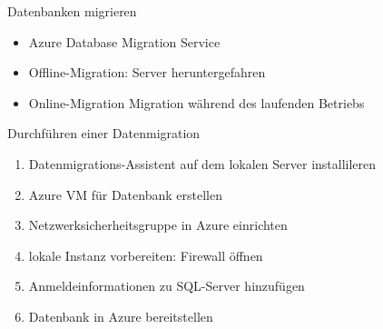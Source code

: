 \begin{flashcard}[Definition]{Datenbanken migrieren}
    \begin{itemize}
        \item Azure Database Migration Service
        \item Offline-Migration:\newline
            Server heruntergefahren
        \item Online-Migration\newline
            Migration während des laufenden Betriebs
    \end{itemize}
\end{flashcard}

\begin{flashcard}[Definition]{Durchführen einer Datenmigration}
    \begin{enumerate}
        \item Datenmigrations-Assistent auf dem lokalen Server installileren
        \item Azure VM für Datenbank erstellen
        \item Netzwerksicherheitsgruppe in Azure einrichten
        \item lokale Instanz vorbereiten: Firewall öffnen
        \item Anmeldeinformationen zu SQL-Server hinzufügen
        \item Datenbank in Azure bereitstellen
    \end{enumerate}
\end{flashcard}
